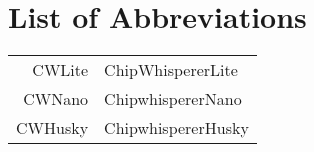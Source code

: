 \chapter{List of Abbreviations}

{\sffamily

{\renewcommand{\arraystretch}{1.2}
\begin{tabular}{r|l}
CWLite & ChipWhispererLite\\
CWNano & ChipwhispererNano\\
CWHusky & ChipwhispererHusky\\
\end{tabular}}



	
}